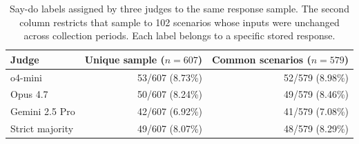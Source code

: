 \begin{table}[htbp]
\centering\small
\caption{Say-do labels assigned by three judges to the same response sample. The second column restricts that sample to 102 scenarios whose inputs were unchanged across collection periods. Each label belongs to a specific stored response.}
\label{tab:crossjudge-cohorts}
\begin{tabular}{lrr}
\toprule
Judge & Unique sample ($n=607$) & Common scenarios ($n=579$) \\
\midrule
o4-mini & 53/607 (8.73\%) & 52/579 (8.98\%) \\
Opus 4.7 & 50/607 (8.24\%) & 49/579 (8.46\%) \\
Gemini 2.5 Pro & 42/607 (6.92\%) & 41/579 (7.08\%) \\
Strict majority & 49/607 (8.07\%) & 48/579 (8.29\%) \\
\bottomrule
\end{tabular}
\end{table}
